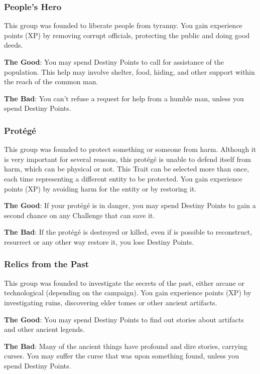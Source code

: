 \begin{multicols}{2}
\subsubsection{People’s Hero}
This group was founded to liberate people from tyranny. You gain experience points (XP) by removing corrupt officials, protecting the public and doing good deeds.

\textbf{The Good}: You may spend Destiny Points to call for assistance of the population. This help may involve shelter, food, hiding, and other support within the reach of the common man.

\textbf{The Bad}: You can’t refuse a request for help from a humble man, unless you spend Destiny Points.

\subsubsection{Protégé}
This group was founded to protect something or someone from harm. Although it is very important for several reasons, this protégé is unable to defend itself from harm, which can be physical or not. This Trait can be selected more than once, each time representing a different entity to be protected. You gain experience points (XP) by avoiding harm for the entity or by restoring it.

\textbf{The Good}: If your protégé is in danger, you may spend Destiny Points to gain a second chance on any Challenge that can save it.

\textbf{The Bad}: If the protégé is destroyed or killed, even if is possible to reconstruct, resurrect or any other way restore it, you lose Destiny Points.

{\centering %
}

\subsubsection{Relics from the Past}
This group was founded to investigate the secrets of the past, either arcane or technological (depending on the campaign). You gain experience points (XP) by investigating ruins, discovering elder tomes or other ancient artifacts.

\textbf{The Good}: You may spend Destiny Points to find out stories about artifacts and other ancient legends.

\textbf{The Bad}: Many of the ancient things have profound and dire stories, carrying curses. You may suffer the curse that was upon something found, unless you spend Destiny Points. \pc%


\end{multicols}
